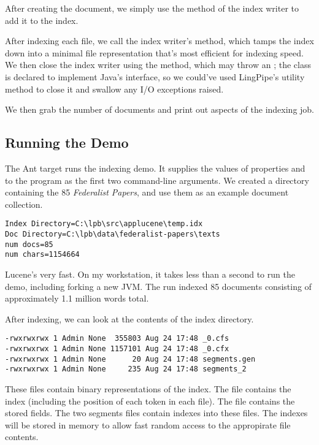 After creating the document, we simply use the
 method of the index writer to add it
to the index.  

After indexing each file, we call the index writer's 
method, which tamps the index down into a minimal file representation
that's most efficient for indexing speed.  We then close the index
writer using the  method, which may throw an
; the  class is declared to
implement Java's  interface, so we could've used
LingPipe's  utility method to close
it and swallow any I/O exceptions raised.

We then grab the number of documents and print out aspects of
the indexing job.

\subsection{Running the Demo}

The Ant target  runs the indexing demo.  It
supplies the values of properties  and 
to the program as the first two command-line arguments.  We created a
directory containing the 85 {\it Federalist Papers}, and use them
as an example document collection.
%
\begin{verbatim}
Index Directory=C:\lpb\src\applucene\temp.idx
Doc Directory=C:\lpb\data\federalist-papers\texts
num docs=85
num chars=1154664
\end{verbatim}
%
Lucene's very fast.  On my workstation, it takes less than a second to
run the demo, including forking a new JVM.  The run indexed 85
documents consisting of approximately 1.1 million words total.

After indexing, we can look at the contents of the index directory.
%
\begin{verbatim}
-rwxrwxrwx 1 Admin None  355803 Aug 24 17:48 _0.cfs
-rwxrwxrwx 1 Admin None 1157101 Aug 24 17:48 _0.cfx
-rwxrwxrwx 1 Admin None      20 Aug 24 17:48 segments.gen
-rwxrwxrwx 1 Admin None     235 Aug 24 17:48 segments_2
\end{verbatim}
%
These files contain binary representations of the index.  The
 file contains the index (including the position of each
token in each file).  The  file contains the stored fields. 
The two segments files contain indexes into these files.  The indexes
will be stored in memory to allow fast random access to the appropirate
file contents.

